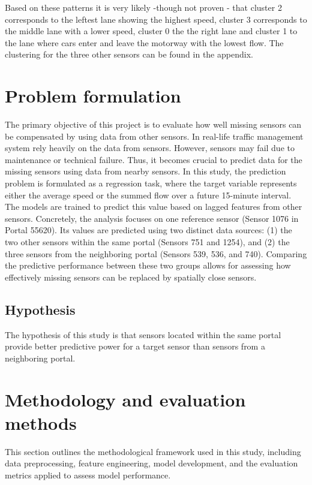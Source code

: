 	\noindent Based on these patterns it is very likely -though not proven - that cluster 2 corresponds to the leftest lane showing the highest speed, cluster 3 corresponds to the middle lane with a lower speed, cluster 0 the the right lane and cluster 1 to the lane where cars enter and leave the motorway with the lowest flow.
	The clustering for the three other sensors can be found in the appendix.

	\section{Problem formulation}
	The primary objective of this project is to evaluate how well missing sensors can be compensated by using data from other sensors. \newline 
	In real-life traffic management system rely heavily on the data from sensors. However, sensors may fail due to maintenance or technical failure. Thus, it becomes crucial to predict data for the missing sensors using data from nearby sensors. \newline 
	In this study, the prediction problem is formulated as a regression task, where the target variable represents either the average speed or the summed flow over a future 15-minute interval. The models are trained to predict this value based on lagged features from other sensors.\newline 
	Concretely, the analysis focuses on one reference sensor (Sensor 1076 in Portal 55620). Its values are predicted using two distinct data sources: (1) the two other sensors within the same portal (Sensors 751 and 1254), and (2) the three sensors from the neighboring portal (Sensors 539, 536, and 740). Comparing the predictive performance between these two groups allows for assessing how effectively missing sensors can be replaced by spatially close sensors.
	\subsection{Hypothesis}
	The hypothesis of this study is that sensors located within the same portal provide better predictive power for a target sensor than sensors from a neighboring portal.

%	
	\section{Methodology and evaluation methods}
	This section outlines the methodological framework used in this study, including data preprocessing, feature engineering, model development, and the evaluation metrics applied to assess model performance.
